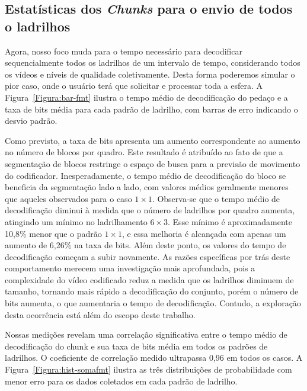 {\subsection{Estatísticas dos \textit{Chunks} para o envio de todos o ladrilhos}

Agora, nosso foco muda para o tempo necessário para decodificar sequencialmente todos os ladrilhos de um intervalo de tempo, considerando todos os vídeos e níveis de qualidade coletivamente. Desta forma poderemos simular o pior caso, onde o usuário terá que solicitar e processar toda a esfera. A Figura~\ref{Figura:bar-fmt} ilustra o tempo médio de decodificação do pedaço e a taxa de bits média para cada padrão de ladrilho, com barras de erro indicando o desvio padrão.

Como previsto, a taxa de bits apresenta um aumento correspondente ao aumento no número de blocos por quadro. Este resultado é atribuído ao fato de que a segmentação de blocos restringe o espaço de busca para a previsão de movimento do codificador. Inesperadamente, o tempo médio de decodificação do bloco se beneficia da segmentação lado a lado, com valores médios geralmente menores que aqueles observados para o caso $1 \times 1$. Observa-se que o tempo médio de decodificação diminui à medida que o número de ladrilhos por quadro aumenta, atingindo um mínimo no ladrilhamento $6 \times 3$. Esse mínimo é aproximadamente 10,8\% menor que o padrão $1 \times 1$, e essa melhoria é alcançada com apenas um aumento de 6,26\% na taxa de bits. Além deste ponto, os valores do tempo de decodificação começam a subir novamente. As razões específicas por trás deste comportamento merecem uma investigação mais aprofundada, pois a complexidade do vídeo codificado reduz a medida que os ladrilhos diminuem de tamanho, tornando mais rápido a decodificação do conjunto, porém o número de bits aumenta, o que aumentaria o tempo de decodificação. Contudo, a exploração desta ocorrência está além do escopo deste trabalho.


Nossas medições revelam uma correlação significativa entre o tempo médio de decodificação do chunk e sua taxa de bits média em todos os padrões de ladrilhos. O coeficiente de correlação medido ultrapassa 0,96 em todos os casos. A Figura~\ref{Figura:hist-somafmt} ilustra as três distribuições de probabilidade com menor erro para os dados coletados em cada padrão de ladrilho.

}

